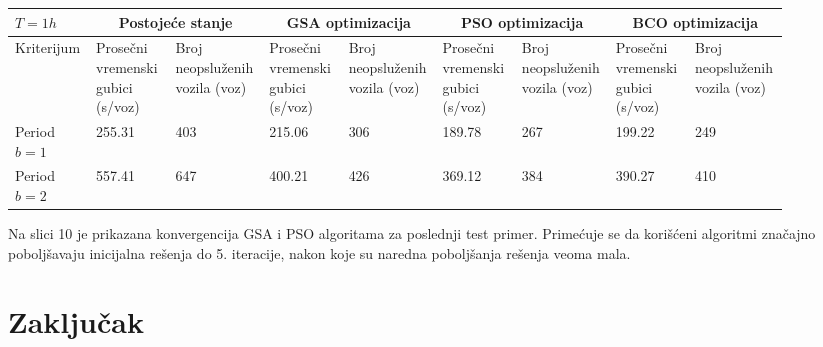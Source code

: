 

\begin{table*}
    \begin{center}
      \begin{tabular}{p{0.1\linewidth}p{0.1\linewidth}p{0.1\linewidth}p{0.1\linewidth}p{0.1\linewidth}p{0.1\linewidth}p{0.1\linewidth}p{0.1\linewidth}p{0.1\linewidth}}
        \toprule
        $ T = 1h $ & \multicolumn{2}{c}{\textbf{Postojeće stanje}}
        & \multicolumn{2}{c}{\textbf{GSA optimizacija}}
        & \multicolumn{2}{c}{\textbf{PSO optimizacija}} 
        & \multicolumn{2}{c}{\textbf{BCO optimizacija}} \\ 
        \midrule
  Kriterijum &
  Prosečni vremenski gubici (s/voz) & 
  Broj neopsluženih vozila (voz) & 
  Prosečni vremenski gubici (s/voz) & 
  Broj neopsluženih vozila (voz) & 
  Prosečni vremenski gubici (s/voz) & 
  Broj neopsluženih vozila (voz) & 
  Prosečni vremenski gubici (s/voz) & 
  Broj neopsluženih vozila (voz) \\ 
  \hline
  Period $b=1$ & 
  255.31 & 
  403 & 
  215.06 & 
  306 & 
  189.78 & 
  267 & 
  199.22 & 
  249 \\ 
  \hline
  
  Period $b=2$ & 
  557.41 &
  647  &
  400.21 &
  426 & 
  369.12 & 
  384 &
  390.27 & 
  410 \\
  
  \bottomrule
  
        
      \end{tabular}
    \end{center}
  \end{table*}
  
Na slici 10 je prikazana konvergencija GSA i PSO algoritama za poslednji test primer. Primećuje se da korišćeni algoritmi značajno poboljšavaju inicijalna rešenja do 5. iteracije, nakon koje su naredna poboljšanja rešenja veoma mala.


\section{Zaključak}

